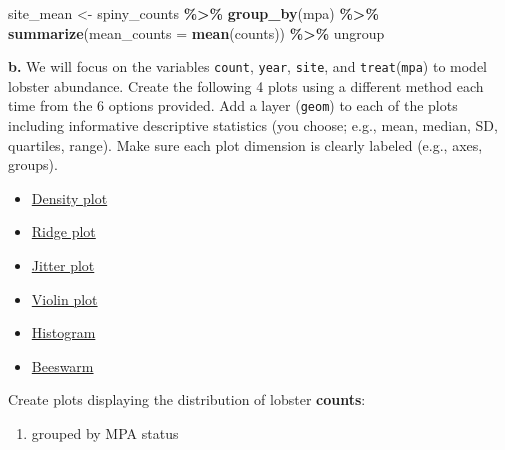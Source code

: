 \documentclass[
]{article}
\newenvironment{Shaded}{\begin{snugshade}}{\end{snugshade}}
\newcommand{\AttributeTok}[1]{\textcolor[rgb]{0.13,0.29,0.53}{#1}}
\newcommand{\FunctionTok}[1]{\textcolor[rgb]{0.13,0.29,0.53}{\textbf{#1}}}
\newcommand{\NormalTok}[1]{#1}
\newcommand{\OtherTok}[1]{\textcolor[rgb]{0.56,0.35,0.01}{#1}}
\newcommand{\SpecialCharTok}[1]{\textcolor[rgb]{0.81,0.36,0.00}{\textbf{#1}}}
\providecommand{\tightlist}{%
  \setlength{\itemsep}{0pt}\setlength{\parskip}{0pt}}
\begin{document}
\begin{Shaded}
\begin{Highlighting}[]
\NormalTok{site\_mean }\OtherTok{\textless{}{-}}\NormalTok{ spiny\_counts }\SpecialCharTok{\%\textgreater{}\%}
  \FunctionTok{group\_by}\NormalTok{(mpa) }\SpecialCharTok{\%\textgreater{}\%}
  \FunctionTok{summarize}\NormalTok{(}\AttributeTok{mean\_counts =} \FunctionTok{mean}\NormalTok{(counts)) }\SpecialCharTok{\%\textgreater{}\%}
\NormalTok{  ungroup}
\end{Highlighting}
\end{Shaded}

\textbf{b.} We will focus on the variables \texttt{count},
\texttt{year}, \texttt{site}, and \texttt{treat}(\texttt{mpa}) to model
lobster abundance. Create the following 4 plots using a different method
each time from the 6 options provided. Add a layer (\texttt{geom}) to
each of the plots including informative descriptive statistics (you
choose; e.g., mean, median, SD, quartiles, range). Make sure each plot
dimension is clearly labeled (e.g., axes, groups).

\begin{itemize}
\tightlist
\item
  \href{https://r-charts.com/distribution/density-plot-group-ggplot2}{Density
  plot}
\item
  \href{https://r-charts.com/distribution/ggridges/}{Ridge plot}
\item
  \href{https://ggplot2.tidyverse.org/reference/geom_jitter.html}{Jitter
  plot}
\item
  \href{https://r-charts.com/distribution/violin-plot-group-ggplot2}{Violin
  plot}
\item
  \href{https://r-charts.com/distribution/histogram-density-ggplot2/}{Histogram}
\item
  \href{https://r-charts.com/distribution/beeswarm/}{Beeswarm}
\end{itemize}

Create plots displaying the distribution of lobster \textbf{counts}:

\begin{enumerate}
\def\labelenumi{\arabic{enumi})}
\tightlist
\item
  grouped by MPA status
\end{enumerate}
\end{document}
